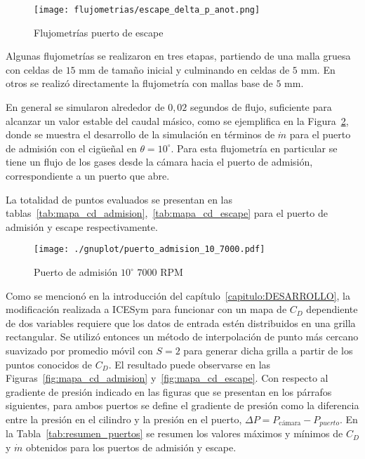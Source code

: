 \begin{figure}[h!]
  \centering
  \texttt{[image: flujometrias/escape\_delta\_p\_anot.png]}
  \caption{Flujometrías puerto de escape}\label{fig:delta_p_escape}
\end{figure}


Algunas flujometrías se realizaron en tres etapas, partiendo de una malla gruesa
con celdas de $15$ mm de tamaño inicial y culminando en celdas de $5$ mm.
%
En otros se realizó directamente la flujometría con mallas base de $5$ mm.

En general se simularon alrededor de $0,02$ segundos de flujo, suficiente para
alcanzar un valor estable del caudal másico, como se ejemplifica en la
Figura~\ref{fig:adm_10_7000rpm}, donde se muestra el desarrollo de la simulación
en términos de $\dot{m}$ para el puerto de admisión con el cigüeñal en
$\theta=10^{\circ}$.
%
Para esta flujometría en particular se tiene un flujo de los gases desde la
cámara hacia el puerto de admisión, correspondiente a un puerto que abre.

%
%
La totalidad de puntos evaluados se presentan en las
tablas~\ref{tab:mapa_cd_admision},~\ref{tab:mapa_cd_escape} para el puerto de
admisión y escape respectivamente.

\begin{figure}[h]
  \centering
  \texttt{[image: ./gnuplot/puerto\_admision\_10\_7000.pdf]}
  \caption{Puerto de admisión $10^{\circ}$ \@ $7000$ RPM}\label{fig:adm_10_7000rpm}
\end{figure}

Como se mencionó en la introducción del capítulo~\ref{capitulo:DESARROLLO}, la
modificación realizada a ICESym para funcionar con un mapa de $C_{D}$
dependiente de dos variables requiere que los datos de entrada estén
distribuidos en una grilla rectangular.
%
Se utilizó entonces un método de interpolación de punto más cercano suavizado
por promedio móvil con $S=2$ para generar dicha grilla a partir de los puntos
conocidos de $C_{D}$.
%
El resultado puede observarse en las Figuras~\ref{fig:mapa_cd_admision}
y~\ref{fig:mapa_cd_escape}.
%
Con respecto al gradiente de presión indicado en las figuras que se presentan en
los párrafos siguientes, para ambos puertos se define el gradiente de presión
como la diferencia entre la presión en el cilindro y la presión en el puerto,
$\Delta P = P_{\text{c\'amara}} - P_{puerto}$.
%
En la Tabla~\ref{tab:resumen_puertos} se resumen los valores máximos y mínimos
de $C_{D}$ y $\dot{m}$ obtenidos para los puertos de admisión y escape.

